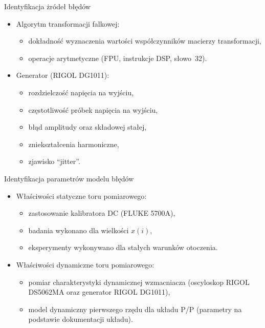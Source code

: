 \documentclass[12pt, polish, aspectratio = 169]{slides}
\begin{document}
\begin{frame}{Identyfikacja żródeł błędów}
\begin{itemize}
\item Algorytm transformacji falkowej:
	\begin{itemize}
	\item dokładność wyznaczenia wartości współczynników macierzy transformacji,
	\item operacje arytmetyczne (FPU, instrukcje DSP, słowo~\qty{32}{\bitOwe}).
	\end{itemize}
\item Generator (RIGOL DG1011):
	\begin{itemize}
	\item rozdzielczość napięcia na wyjściu,
	\item częstotliwość próbek napięcia na wyjściu,
	\item błąd amplitudy oraz składowej stałej,
	\item zniekształcenia harmoniczne,
	\item zjawisko \enquote{jitter}.
	\end{itemize}
\end{itemize}
\end{frame}

\begin{frame}{Identyfikacja parametrów modelu błędów}
\begin{itemize}
\item Właściwości statyczne toru pomiarowego:
	\begin{itemize}
	\item zastosowanie kalibratora DC (FLUKE 5700A),
	\item badania wykonano dla wielkości $x(i)$,
	\item eksperymenty wykonywano dla stałych warunków otoczenia.
	\end{itemize}
\item Właściwości dynamiczne toru pomiarowego:
	\begin{itemize}
	\item pomiar charakterystyki dynamicznej wzmacniacza (oscyloskop RIGOL DS5062MA oraz generator RIGOL DG1011),
	\item model dynamiczny pierwszego rzędu dla układu P/P (parametry na podstawie dokumentacji układu).
	\end{itemize}
\end{itemize}
\end{frame}
\end{document}

